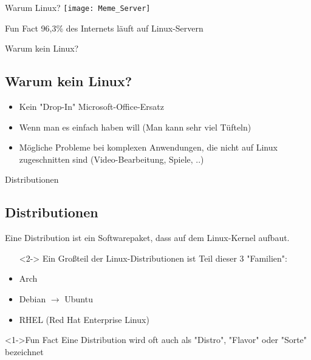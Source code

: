 \begin{frame}{Warum Linux?}
    \texttt{[image: Meme\_Server]}

    \begin{exampleblock}{Fun Fact}
        96,3\% des Internets läuft auf Linux-Servern
    \end{exampleblock}
\end{frame}

\begin{frame}{Warum kein Linux?}
    \subsection{Warum kein Linux?}\label{subsec:warum-kein-linux?}

    \begin{itemize}
        \item Kein "Drop-In" Microsoft-Office-Ersatz\pause
        \item Wenn man es einfach haben will (Man kann sehr viel Tüfteln)\pause
        \item Mögliche Probleme bei komplexen Anwendungen, die nicht auf Linux zugeschnitten sind (Video-Bearbeitung, Spiele, ..)
    \end{itemize}

\end{frame}

\begin{frame}{Distributionen}
    \subsection{Distributionen}\label{subsec:distributionen}

    Eine Distribution ist ein Softwarepaket, dass auf dem Linux-Kernel aufbaut.

    \begin{itemize}
        \item[]<2-> Ein Großteil der Linux-Distributionen ist Teil dieser 3 "Familien":
    \end{itemize}

    \begin{itemize}
        \item<3-> Arch
        \item<4-> Debian $\longrightarrow$ Ubuntu
        \item<5-> RHEL (Red Hat Enterprise Linux)
    \end{itemize}

    \vspace{0.5cm}
    \begin{exampleblock}<1->{Fun Fact}
        Eine Distribution wird oft auch als "Distro", "Flavor" oder "Sorte" bezeichnet
    \end{exampleblock}

\end{frame}


